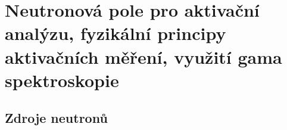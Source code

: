 \section[Aktivační měření, gama spektroskopie]{Neutronová pole pro aktivační analýzu, fyzikální principy aktivačních měření, využití gama spektroskopie}

\subsection{Zdroje neutronů}